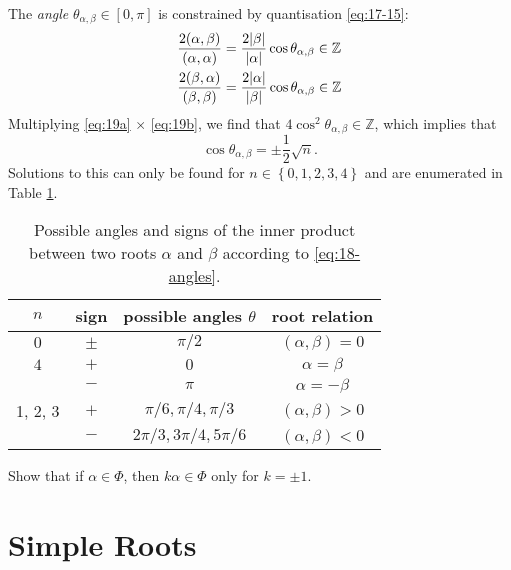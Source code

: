 The \emph{angle} $\theta_{\alpha, \beta} \in [0, \pi]$ is constrained by quantisation \eqref{eq:17-15}:
\begin{subequations}
  \begin{align}
    \frac{2 (\alpha, \beta)}{(\alpha, \alpha)} &= \frac{2 \abs{\beta}}{\abs{ \alpha}} \cos \theta_{\alpha, \beta} \in \mathbb{Z} \label{eq:19a} \\
    \frac{2 (\beta , \alpha)}{(\beta, \beta)} &= \frac{2 \abs{\alpha}}{\abs{\beta}} \cos \theta_{\alpha, \beta} \in \mathbb{Z} \label{eq:19b}
  \end{align}
\end{subequations}
Multiplying \eqref{eq:19a} $\times$ \eqref{eq:19b}, we find that $4 \cos^2 \theta_{\alpha, \beta} \in \mathbb{Z}$, which implies that
\begin{equation}
  \label{eq:18-angles}
  \cos\theta_{\alpha, \beta} = \pm \frac{1}{2} \sqrt{n}.
\end{equation}
Solutions to this can only be found for $n \in \left\{ 0, 1, 2, 3, 4 \right\}$ and are enumerated in Table \ref{tab:18-1}.
\begin{table}[btp]
  \centering
  \begin{tabular}{|c|c|c|c|}
    \hline
    $n$ & sign & possible angles $\theta$ & root relation \\
    \hline
    $0$ & $\pm$ & ${\pi} / {2}$ & $(\alpha, \beta) = 0$ \\
    $4$ & $+$ & $0$ & $\alpha = \beta$ \\
	& $-$ & $\pi$ & $\alpha = -\beta$ \\
    1, 2, 3 & $+$ & $\pi / 6, \pi/4, \pi/3$ & $(\alpha, \beta) > 0$ \\
	    & $-$ & $2\pi/3, 3 \pi/4, 5 \pi / 6$ & $(\alpha, \beta) <0$ \\
    \hline
  \end{tabular}
  \caption{Possible angles and signs of the inner product between two roots $\alpha$ and $\beta$ according to \eqref{eq:18-angles}.}
  \label{tab:18-1}
\end{table}

\begin{exercise}
  Show that if $\alpha \in \Phi$, then  $k \alpha \in \Phi$ only for  $k = \pm 1$.
\end{exercise}

\section{Simple Roots}%
\label{sec:simple_roots}

